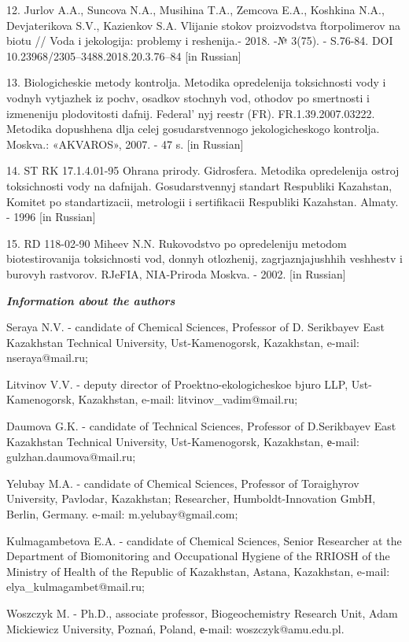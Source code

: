 12. Jurlov A.A., Suncova N.A., Musihina T.A., Zemcova E.A., Koshkina
N.A., Devjaterikova S.V., Kazienkov S.A. Vlijanie stokov proizvodstva
ftorpolimerov na biotu // Voda i jekologija: problemy i reshenija.-
2018. -№ 3(75). - S.76-84. DOI 10.23968/2305--3488.2018.20.3.76--84
{[}in Russian{]}

13. Biologicheskie metody kontrolja. Metodika opredelenija toksichnosti
vody i vodnyh vytjazhek iz pochv, osadkov stochnyh vod, othodov po
smertnosti i izmeneniju plodovitosti dafnij. Federal' nyj
reestr (FR). FR.1.39.2007.03222. Metodika dopushhena dlja celej
gosudarstvennogo jekologicheskogo kontrolja. Moskva.: «AKVAROS», 2007. -
47 s. {[}in Russian{]}

14. ST RK 17.1.4.01-95 Ohrana prirody. Gidrosfera. Metodika opredelenija
ostroj toksichnosti vody na dafnijah. Gosudarstvennyj standart
Respubliki Kazahstan, Komitet po standartizacii, metrologii i
sertifikacii Respubliki Kazahstan. Almaty. - 1996 {[}in Russian{]}

15. RD 118-02-90 Miheev N.N. Rukovodstvo po opredeleniju metodom
biotestirovanija toksichnosti vod, donnyh otlozhenij, zagrjaznjajushhih
veshhestv i burovyh rastvorov. RJeFIA, NIA-Priroda Moskva. - 2002. {[}in
Russian{]}

\emph{{\bfseries Information about the authors}}

Seraya N.V. - candidate of Chemical Sciences, Professor of D. Serikbayev
East Kazakhstan Technical University, Ust-Kamenogorsk\emph{,}
Kazakhstan, e-mail:
nseraya@mail.ru;

Litvinov V.V. - deputy director of Proektno-ekologicheskoe bjuro LLP,
Ust-Kamenogorsk, Kazakhstan, e-mail:
litvinov\_vadim@mail.ru;

Daumova G.K. - candidate of Technical Sciences, Professor of
D.Serikbayev East Kazakhstan Technical University,
Ust-Kamenogorsk\emph{,} Kazakhstan, е-mail:
gulzhan.daumova@mail.ru;

Yelubay M.A. - candidate of Chemical Sciences, Professor of Toraighyrov
University, Pavlodar, Kazakhstan; Researcher, Humboldt-Innovation GmbH,
Berlin, Germany. e-mail: m.yelubay@gmail.com;

Kulmagambetova E.A. - candidate of Chemical Sciences, Senior Researcher
at the Department of Biomonitoring and Occupational Hygiene of the
RRIOSH of the Ministry of Health of the Republic of Kazakhstan, Astana,
Kazakhstan, e-mail:
elya\_kulmagambet@mail.ru;

Woszczyk M. - Ph.D., associate professor, Biogeochemistry Research Unit,
Adam Mickiewicz University, Poznań, Poland, е-mail:
woszczyk@amu.edu.pl.

